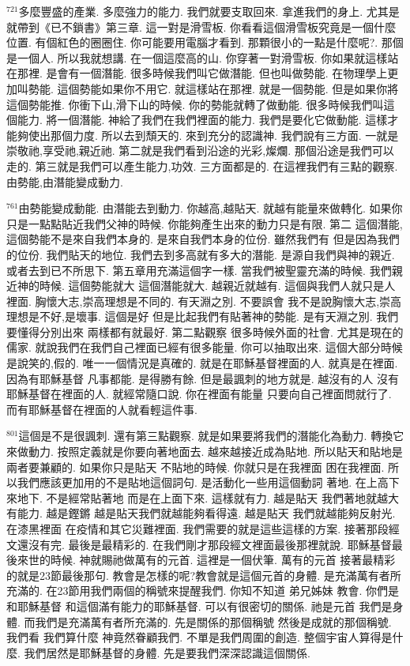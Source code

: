 \documentclass{book}
\begin{document}
$^{721}$多麼豐盛的產業.
多麼強力的能力.
我們就要支取回來.
拿進我們的身上.
尤其是就帶到《已不鎖書》第三章.
這一對是滑雪板.
你看看這個滑雪板究竟是一個什麼位置.
有個紅色的圈圈住.
你可能要用電腦才看到.
那顆很小的一點是什麼呢?.
那個是一個人.
所以我就想講.
在一個這麼高的山.
你穿著一對滑雪板.
你如果就這樣站在那裡.
是會有一個潛能.
很多時候我們叫它做潛能.
但也叫做勢能.
在物理學上更加叫勢能.
這個勢能如果你不用它.
就這樣站在那裡.
就是一個勢能.
但是如果你將這個勢能推.
你衝下山,滑下山的時候.
你的勢能就轉了做動能.
很多時候我們叫這個能力.
將一個潛能.
神給了我們在我們裡面的能力.
我們是要化它做動能.
這樣才能夠使出那個力度.
所以去到頹天的.
來到充分的認識神.
我們說有三方面.
一就是崇敬祂,享受祂,親近祂.
第二就是我們看到沿途的光彩,燦爛.
那個沿途是我們可以走的.
第三就是我們可以產生能力,功效.
三方面都是的.
在這裡我們有三點的觀察.
由勢能,由潛能變成動力.

$^{761}$由勢能變成動能.
由潛能去到動力.
你越高,越貼天.
就越有能量來做轉化.
如果你只是一點點貼近我們父神的時候.
你能夠產生出來的動力只是有限.
第二 這個潛能,這個勢能不是來自我們本身的.
是來自我們本身的位份.
雖然我們有 但是因為我們的位份.
我們貼天的地位.
我們去到多高就有多大的潛能.
是源自我們與神的親近.
或者去到已不所思下.
第五章用充滿這個字一樣.
當我們被聖靈充滿的時候.
我們親近神的時候.
這個勢能就大 這個潛能就大.
越親近就越有.
這個與我們人就只是人裡面.
胸懷大志,崇高理想是不同的.
有天淵之別.
不要誤會 我不是說胸懷大志,崇高理想是不好,是壞事.
這個是好 但是比起我們有貼著神的勢能.
是有天淵之別.
我們要懂得分別出來 兩樣都有就最好.
第二點觀察 很多時候外面的社會.
尤其是現在的儒家.
就說我們在我們自己裡面已經有很多能量.
你可以抽取出來.
這個大部分時候是說笑的,假的.
唯一一個情況是真確的.
就是在耶穌基督裡面的人.
就真是在裡面.
因為有耶穌基督 凡事都能.
是得勝有餘.
但是最諷刺的地方就是.
越沒有的人 沒有耶穌基督在裡面的人.
就經常隨口說.
你在裡面有能量 只要向自己裡面問就行了.
而有耶穌基督在裡面的人就看輕這件事.

$^{801}$這個是不是很諷刺.
還有第三點觀察.
就是如果要將我們的潛能化為動力.
轉換它來做動力.
按照定義就是你要向著地面去.
越來越接近成為貼地.
所以貼天和貼地是兩者要兼顧的.
如果你只是貼天 不貼地的時候.
你就只是在我裡面 困在我裡面.
所以我們應該更加用的不是貼地這個詞句.
是活動化一些用這個動詞 著地.
在上高下來地下.
不是經常貼著地 而是在上面下來.
這樣就有力.
越是貼天 我們著地就越大有能力.
越是鏗鏘 越是貼天我們就越能夠看得遠.
越是貼天 我們就越能夠反射光.
在漆黑裡面 在疫情和其它災難裡面.
我們需要的就是這些這樣的方案.
接著那段經文還沒有完.
最後是最精彩的.
在我們剛才那段經文裡面最後那裡就說.
耶穌基督最後來世的時候.
神就賜祂做萬有的元首.
這裡是一個伏筆.
萬有的元首 接著最精彩的就是23節最後那句.
教會是怎樣的呢?教會就是這個元首的身體.
是充滿萬有者所充滿的.
在23節用我們兩個的稱號來提醒我們.
你知不知道 弟兄姊妹 教會.
你們是和耶穌基督 和這個滿有能力的耶穌基督.
可以有很密切的關係.
祂是元首 我們是身體.
而我們是充滿萬有者所充滿的.
先是關係的那個稱號 然後是成就的那個稱號.
我們看 我們算什麼 神竟然眷顧我們.
不單是我們周圍的創造.
整個宇宙人算得是什麼.
我們居然是耶穌基督的身體.
先是要我們深深認識這個關係.
\end{document}
